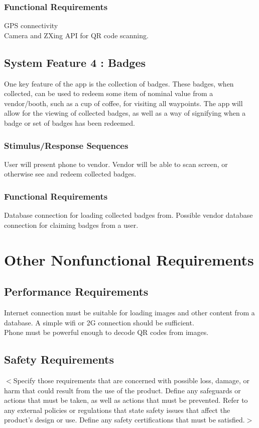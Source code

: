 \documentclass{scrreprt}
\begin{document}
\subsection{Functional Requirements}
GPS connectivity \\
Camera and ZXing API for QR code scanning.

\section{System Feature 4 : Badges}
One key feature of the app is the collection of badges. These badges, when collected,
can be used to redeem some item of nominal value from a vendor/booth, such as a 
cup of coffee, for visiting all waypoints. The app will allow for the viewing of collected 
badges, as well as a way of signifying when a badge or set of badges has been redeemed.

\subsection{Stimulus/Response Sequences}
User will present phone to vendor. Vendor will be able to scan screen, or otherwise 
see and redeem collected badges.

\subsection{Functional Requirements}
Database connection for loading collected badges from. Possible vendor database connection 
for claiming badges from a user.


\chapter{Other Nonfunctional Requirements}

\section{Performance Requirements}
Internet connection must be suitable for loading images and other content from a 
database. A simple wifi or 2G connection should be sufficient. \\
Phone must be powerful enough to decode QR codes from images.

\section{Safety Requirements}
$<$Specify those requirements that are concerned with possible loss, damage, or 
harm that could result from the use of the product. Define any safeguards or 
actions that must be taken, as well as actions that must be prevented. Refer to 
any external policies or regulations that state safety issues that affect the 
product’s design or use. Define any safety certifications that must be 
satisfied.$>$
\end{document}
